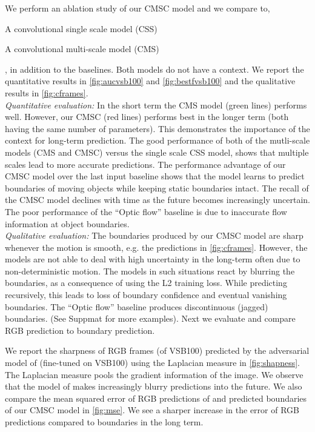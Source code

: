 We perform an ablation study of our CMSC model and we compare to, \begin{enumerate*} \item A convolutional single scale model (CSS) \item A convolutional multi-scale model (CMS) \end{enumerate*}, in addition to the baselines. Both models do not have a context. We report the quantitative results in \autoref{fig:aucvsb100} and \autoref{fig:bestfvsb100} and the qualitative results in \autoref{fig:cframes}. \\
{\textit{Quantitative evaluation:} } In the short term the CMS model (green lines) performs well. However, our CMSC (red lines) performs best in the longer term (both having the same number of parameters). This demonstrates the importance of the context for long-term prediction. The good performance of both of the mutli-scale models (CMS and CMSC) versus the single scale CSS model, shows that multiple scales lead to more accurate predictions. The performance advantage of our CMSC model over the last input baseline shows that the model learns to predict boundaries of moving objects while keeping static boundaries intact. The recall of the CMSC model declines with time as the future becomes increasingly uncertain. The poor performance of the ``Optic flow'' baseline is due to inaccurate flow information at object boundaries.   \\
{\textit{Qualitative evaluation:} } The boundaries produced by our CMSC model are sharp whenever the motion is smooth, e.g. the predictions in \autoref{fig:cframes}. However, the models are not able to deal with high uncertainty in the long-term often due to non-deterministic motion. The models in such situations react by blurring the boundaries, as a consequence of using the L2 training loss. While predicting recursively, this leads to loss of boundary confidence and eventual vanishing boundaries. The ``Optic flow'' baseline produces discontinuous (jagged) boundaries. (See Suppmat for more examples). Next we evaluate and compare RGB prediction to boundary prediction.

We report the sharpness of RGB frames (of VSB100) predicted by the adversarial model of \cite{mathieu2015deep} (fine-tuned on VSB100) using the Laplacian measure \cite{krotkov2012active} in \autoref{fig:shapness}. The Laplacian measure pools the gradient information of the image. We observe that the model of \cite{mathieu2015deep} makes increasingly blurry predictions into the future. We also compare the mean squared error of RGB predictions of \cite{mathieu2015deep} and predicted boundaries of our CMSC model in \autoref{fig:mse}. We see a sharper increase in the error of RGB predictions compared to boundaries in the long term.

